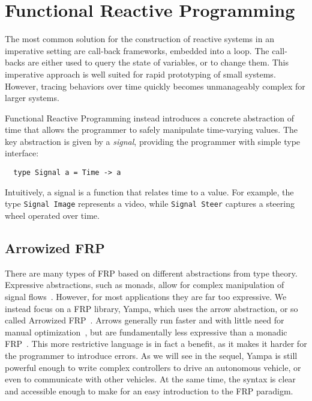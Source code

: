 \section{Functional Reactive Programming}

The most common solution for the construction of reactive systems in an imperative setting are call-back frameworks, embedded into a loop.
The call-backs are either used to query the state of variables, or to change them.
This imperative approach is well suited for rapid prototyping of small systems.
However, tracing behaviors over time quickly becomes unmanageably complex for larger systems.

Functional Reactive Programming instead introduces a concrete abstraction of time that allows the programmer to safely manipulate time-varying values. 
The key abstraction is given by a \textit{signal}, providing the programmer with simple type interface:

\begin{lstlisting}
  type Signal a = Time -> a
\end{lstlisting}

\noindent Intuitively, a signal is a function that relates time to a value.
For example, the type \texttt{Signal Image} represents a video, while \texttt{Signal Steer} captures a steering wheel operated over time.

\subsection{Arrowized FRP}

There are many types of FRP based on different abstractions from type theory.
Expressive abstractions, such as monads, allow for complex manipulation of signal flows~\cite{van2014monadic}. 
However, for most applications they are far too expressive.
We instead focus on a FRP library, Yampa, which uses the arrow abstraction, or so called Arrowized FRP~\cite{hudak2003arrows}.
Arrows generally run faster and with little need for manual optimization~\cite{yallop2016causal}, but are fundamentally less expressive than a monadic FRP~\cite{lindley2011idioms}.
This more restrictive language is in fact a benefit, as it makes it harder for the programmer to introduce errors.
As we will see in the sequel, Yampa is still powerful enough to write complex controllers to drive an autonomous vehicle, or even to communicate with other vehicles.
At the same time, the syntax is clear and accessible enough to make for an easy introduction to the FRP paradigm.

